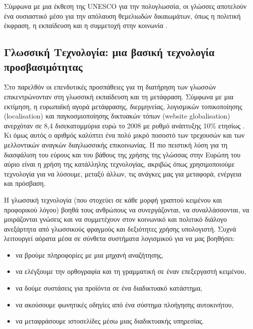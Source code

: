 \documentclass[]{../../metanetpaper}
\begin{document}
\begin{multicols}{2}

Σύμφωνα με μια έκθεση της UNESCO για την πολυγλωσσία, οι γλώσσες αποτελούν ένα ουσιαστικό μέσο για την απόλαυση θεμελιωδών δικαιωμάτων, όπως η πολιτική έκφραση, η εκπαίδευση και η συμμετοχή στην κοινωνία \cite{Unesco1}.

\subsection{Γλωσσική Τεχνολογία: μια βασική τεχνολογία προσβασιμότητας}

Στο παρελθόν οι επενδυτικές προσπάθειες για τη διατήρηση των γλωσσών επικεντρώνονταν στη γλωσσική εκπαίδευση και τη μετάφραση. Σύμφωνα με μια εκτίμηση, η ευρωπαϊκή αγορά μετάφρασης, διερμηνείας, λογισμικών τοπικοποίησης (localisation) και παγκοσμιοποίησης δικτυακών τόπων (website globalisation) ανερχόταν σε 8,4 δισεκατομμύρια ευρώ το 2008 με ρυθμό ανάπτυξης 10\% ετησίως \cite{EC3}. Κι όμως αυτός ο αριθμός καλύπτει ένα πολύ μικρό ποσοστό των τρεχουσών και των μελλοντικών αναγκών διαγλωσσικής επικοινωνίας. Η πιο πειστική λύση για τη διασφάλιση του εύρους και του βάθους της χρήσης της γλώσσας στην Ευρώπη του αύριο είναι η χρήση της κατάλληλης τεχνολογίας, ακριβώς όπως χρησιμοποιούμε τεχνολογία για να λύσουμε, μεταξύ άλλων, τις ανάγκες μας για μεταφορά, ενέργεια και πρόσβαση.

Η γλωσσική τεχνολογία (που στοχεύει σε κάθε μορφή γραπτού κειμένου και προφορικού λόγου) βοηθά τους ανθρώπους να συνεργάζονται, να συναλλάσσονται, να μοιράζονται γνώσεις και να συμμετέχουν στον κοινωνικό και πολιτικό διάλογο ανεξάρτητα από γλωσσικούς φραγμούς και δεξιότητες χρήσης υπολογιστή. Συχνά λειτουργεί αόρατα μέσα σε σύνθετα συστήματα λογισμικού για να μας βοηθήσει:

\begin{itemize}
\item να βρούμε πληροφορίες με μια μηχανή αναζήτησης,
\item να ελέγξουμε την ορθογραφία και τη γραμματική σε έναν επεξεργαστή κειμένου,
\item να δούμε συστάσεις για προϊόντα σε ένα διαδικτυακό κατάστημα,
\item να ακούσουμε φωνητικές οδηγίες από ένα σύστημα πλοήγησης αυτοκινήτου,
\item να μεταφράσουμε ιστοσελίδες μέσω μιας διαδικτυακής υπηρεσίας. 
\end{itemize}


\end{multicols}
\end{document}
